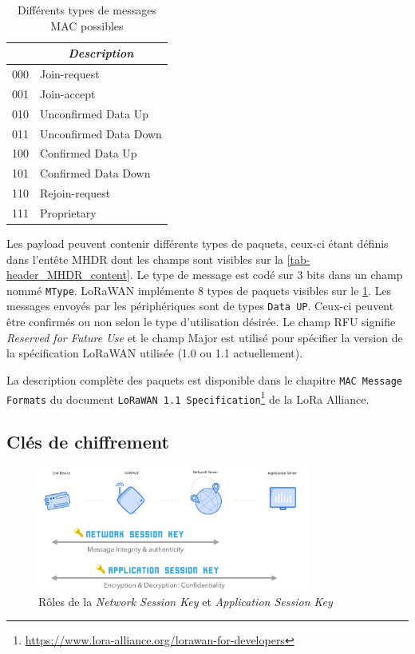 \begin{table}[ht!]
\centering
\caption{Différents types de messages MAC possibles}
\label{tab-mac_message_types}
\begin{tabular}{|l|l|}
\hline
\rowcolor[HTML]{BBDAFF} 
\multicolumn{1}{|c|}{\cellcolor[HTML]{BBDAFF}\textbf{\textit{MType}}} & \multicolumn{1}{c|}{\cellcolor[HTML]{BBDAFF}\textbf{\textit{Description}}} \\ \hline
000 & Join-request \\ \hline
001 & Join-accept \\ \hline
010 & Unconfirmed Data Up \\ \hline
011 & Unconfirmed Data Down \\ \hline
100 & Confirmed Data Up \\ \hline
101 & Confirmed Data Down \\ \hline
110 & Rejoin-request \\ \hline
111 & Proprietary \\ \hline
\end{tabular}
\end{table}

Les payload peuvent contenir différents types de paquets, ceux-ci étant définis dans l'entête MHDR dont les champs sont visibles sur la \cref{tab-header_MHDR_content}. Le type de message est codé sur 3 bits dans un champ nommé \texttt{MType}. LoRaWAN implémente 8 types de paquets visibles sur le \cref{tab-mac_message_types}. Les messages envoyés par les périphériques sont de types \texttt{Data UP}. Ceux-ci peuvent être confirmés ou non selon le type d'utilisation désirée. Le champ RFU signifie \textit{Reserved for Future Use} et le champ Major est utilisé pour spécifier la version de la spécification LoRaWAN utilisée (1.0 ou 1.1 actuellement).

La description complète des paquets est disponible dans le chapitre \texttt{MAC Message Formats} du document \texttt{LoRaWAN 1.1 Specification}\footnote{\url{https://www.lora-alliance.org/lorawan-for-developers}} de la LoRa Alliance. 


\subsection{Clés de chiffrement}

\begin{figure}[ht!]
    \centering
    \includegraphics[width=0.8\textwidth]{Figures/Protocols/LoRaWAN/keys_explained.PNG}
    \caption{Rôles de la \textit{Network Session Key} et \textit{Application Session Key}}
    \label{fig-keys_explained}
\end{figure}

